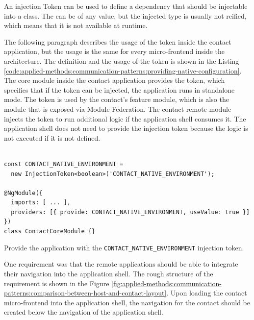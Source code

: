\noindent An injection Token can be used to define a dependency that should be injectable into a class. The can be of any value, but the injected type is usually not reified, which means that it is not available at runtime. \cite{misc:-:applied-methods:communication:angular-injection-token}


\bigskip

\noindent The following paragraph describes the usage of the token inside the contact application, but the usage is the same for every micro-frontend inside the architecture. The definition and the usage of the token is shown in the Listing \ref{code:applied-methods:communication-patterns:providing-native-configuration}. The core module inside the contact application provides the token, which specifies that if the token can be injected, the application runs in standalone mode. The token is used by the contact's feature module, which is also the module that is exposed via Module Federation. The contact remote module injects the token to run additional logic if the application shell consumes it. The application shell does not need to provide the injection token because the logic is not executed if it is not defined.

\ifshowListings
  \begin{listing}[H]
  \begin{verbatim}

const CONTACT_NATIVE_ENVIRONMENT = 
  new InjectionToken<boolean>('CONTACT_NATIVE_ENVIRONMENT');

@NgModule({
  imports: [ ... ],
  providers: [{ provide: CONTACT_NATIVE_ENVIRONMENT, useValue: true }]
})
class ContactCoreModule {}
  \end{verbatim}
  \caption{Provide the application with the \texttt{CONTACT\_NATIVE\_ENVIRONMENT} injection token.}\label{code:applied-methods:communication-patterns:providing-native-configuration}
  \end{listing}
\fi

\noindent One requirement was that the remote applications should be able to integrate their navigation into the application shell. The rough structure of the requirement is shown in the Figure \ref{fig:applied-methods:communication-patterns:comparison-between-host-and-contact-layout}. Upon loading the contact micro-frontend into the application shell, the navigation for the contact should be created below the navigation of the application shell.

